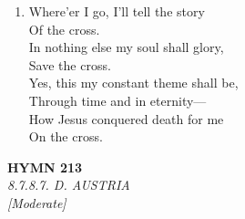\begin{enumerate}
    \item Where'er I go, I'll tell the story \\
            Of the cross. \\
        In nothing else my soul shall glory, \\
            Save the cross. \\
        Yes, this my constant theme shall be, \\
        Through time and in eternity--- \\
        How Jesus conquered death for me \\
            On the cross.

\end{enumerate}

\newpage
\begin{center}
    {\Large \textbf{HYMN 213}}
    \\
    \textit{8.7.8.7. D. AUSTRIA}
    \\
    \textit{\small [Moderate]}
\end{center}
\vspace{1em}


